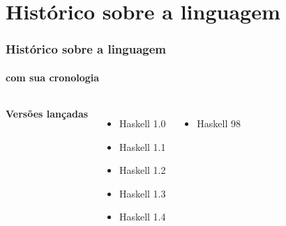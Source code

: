 \section{Histórico sobre a linguagem}
    
\begin{frame}

      \frametitle{Histórico sobre a linguagem}
      \framesubtitle{com sua cronologia}

      \begin{columns}
        \textbf{Versões lançadas} 

        \begin{itemize}
          \item Haskell 1.0 
          \item Haskell 1.1
          \item Haskell 1.2
          \item Haskell 1.3
          \item Haskell 1.4 \pause
           
        \end{itemize}

        
        \begin{itemize}
          \item Haskell 98

        \end{itemize}

      \end{columns}

\end{frame}